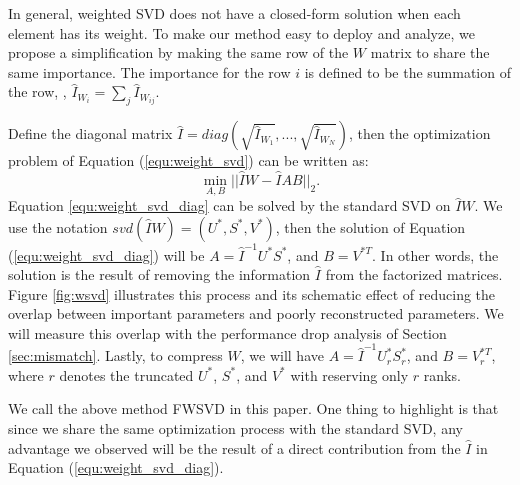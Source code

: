 In general, weighted SVD does not have a closed-form solution \citep{srebro2003weighted} when each element has its weight. To make our method easy to deploy and analyze, we propose a simplification by making the same row of the $W$ matrix to share the same importance. The importance for the row $i$ is defined to be the summation of the row, \ie, $\hat {I}_{W_i}=\sum\limits_{j} \hat {I}_{W_{ij}}$.

Define the diagonal matrix $\hat I= diag(\sqrt{\hat I_{W_1}},...,\sqrt{\hat I_{W_N}})$, then the optimization problem of Equation (\ref{equ:weight_svd}) can be written as:
\begin{equation}
\mathop {\min }\limits_{A,B} ||\hat IW - \hat IAB|{|_2}.
\label{equ:weight_svd_diag}
\end{equation}
Equation \ref{equ:weight_svd_diag} can be solved by the standard SVD on $\hat IW$. We use the notation $svd(\hat IW)=(U^*, S^*, V^*)$, then the solution of Equation (\ref{equ:weight_svd_diag}) will be $A={\hat I}^{ - 1} U^* S^*$, and $B=V^{*T}$. In other words, the solution is the result of removing the information $\hat I$ from the factorized matrices. Figure \ref{fig:wsvd} illustrates this process and its schematic effect of reducing the overlap between important parameters and poorly reconstructed parameters. We will measure this overlap with the performance drop analysis of Section \ref{sec:mismatch}. Lastly, to compress $W$, we will have $A={\hat I}^{ - 1} U_r^* S_r^*$, and $B=V_r^{*T}$, where $r$ denotes the truncated $U^*$, $S^*$, and $V^*$ with reserving only $r$ ranks.  

We call the above method FWSVD in this paper. One thing to highlight is that since we share the same optimization process with the standard SVD, any advantage we observed will be the result of a direct contribution from the $\hat I$ in Equation (\ref{equ:weight_svd_diag}). 


